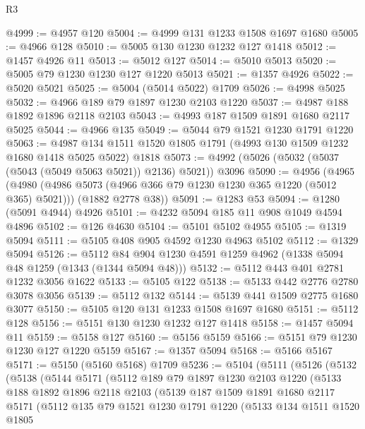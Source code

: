 \begin{lexlean}{R3}
\begin{coremodule}
@4999 := @4957 @120
@5004 := @4999 @131 @1233 @1508 @1697 @1680
@5005 := @4966 @128
@5010 := @5005 @130 @1230 @1232 @127 @1418
@5012 := @1457 @4926 @11
@5013 := @5012 @127
@5014 := @5010 @5013
@5020 := @5005 @79 @1230 @1230 @127 @1220 @5013
@5021 := @1357 @4926
@5022 := @5020 @5021
@5025 := @5004 (@5014 @5022) @1709
@5026 := @4998 @5025
@5032 := @4966 @189 @79 @1897 @1230 @2103 @1220
@5037 := @4987 @188 @1892 @1896 @2118 @2103
@5043 := @4993 @187 @1509 @1891 @1680 @2117 @5025
@5044 := @4966 @135
@5049 := @5044 @79 @1521 @1230 @1791 @1220
@5063 := @4987 @134 @1511 @1520 @1805 @1791 (@4993 @130 @1509 @1232 @1680 @1418 @5025 @5022) @1818
@5073 := @4992 (@5026 (@5032 (@5037 (@5043 (@5049 @5063 @5021)) @2136) @5021)) @3096
@5090 := @4956
    (@4965
      (@4980 (@4986 @5073 (@4966 @366 @79 @1230 @1230 @365 @1220 (@5012 @365) @5021)))
      (@1882 @2778 @38))
@5091 := @1283 @53
@5094 := @1280 (@5091 @4944) @4926
@5101 := @4232 @5094 @185 @11 @908 @1049 @4594 @4896
@5102 := @126 @4630
@5104 := @5101 @5102 @4955
@5105 := @1319 @5094
@5111 := @5105 @408 @905 @4592 @1230 @4963 @5102
@5112 := @1329 @5094
@5126 := @5112 @84 @904 @1230 @4591 @1259 @4962 (@1338 @5094 @48 @1259 (@1343 (@1344 @5094 @48)))
@5132 := @5112 @443 @401 @2781 @1232 @3056 @1622
@5133 := @5105 @122
@5138 := @5133 @442 @2776 @2780 @3078 @3056
@5139 := @5112 @132
@5144 := @5139 @441 @1509 @2775 @1680 @3077
@5150 := @5105 @120 @131 @1233 @1508 @1697 @1680
@5151 := @5112 @128
@5156 := @5151 @130 @1230 @1232 @127 @1418
@5158 := @1457 @5094 @11
@5159 := @5158 @127
@5160 := @5156 @5159
@5166 := @5151 @79 @1230 @1230 @127 @1220 @5159
@5167 := @1357 @5094
@5168 := @5166 @5167
@5171 := @5150 (@5160 @5168) @1709
@5236 := @5104
    (@5111
      (@5126
        (@5132
          (@5138
            (@5144
              @5171
              (@5112
                @189
                @79
                @1897
                @1230
                @2103
                @1220
                (@5133
                  @188
                  @1892
                  @1896
                  @2118
                  @2103
                  (@5139
                    @187
                    @1509
                    @1891
                    @1680
                    @2117
                    @5171
                    (@5112
                      @135
                      @79
                      @1521
                      @1230
                      @1791
                      @1220
                      (@5133
                        @134
                        @1511
                        @1520
                        @1805

\end{coremodule}
\end{lexlean}
